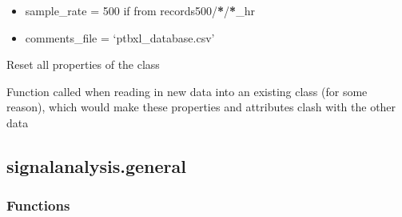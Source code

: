 \documentclass[letterpaper,10pt,english]{sphinxmanual}
\begin{document}
\begin{fulllineitems}
\begin{fulllineitems}
\begin{itemize}
\begin{itemize}
\item {} 
\sphinxAtStartPar
sample\_rate = 500 if from records500/{\color{red}\bfseries{}*}/{\color{red}\bfseries{}*}\_hr

\item {} 
\sphinxAtStartPar
comments\_file = ‘ptbxl\_database.csv’

\end{itemize}

\end{itemize}

\end{fulllineitems}


\begin{fulllineitems}
\label{\detokenize{_autosummary/signalanalysis.ecg.Ecg:signalanalysis.ecg.Ecg.reset}}
\sphinxAtStartPar
Reset all properties of the class

\sphinxAtStartPar
Function called when reading in new data into an existing class (for some reason), which would make these
properties and attributes clash with the other data

\end{fulllineitems}


\end{fulllineitems}



\subsection{signalanalysis.general}
\label{\detokenize{_autosummary/signalanalysis.general:module-signalanalysis.general}}\label{\detokenize{_autosummary/signalanalysis.general:signalanalysis-general}}\label{\detokenize{_autosummary/signalanalysis.general::doc}}\subsubsection*{Functions}
\end{document}
